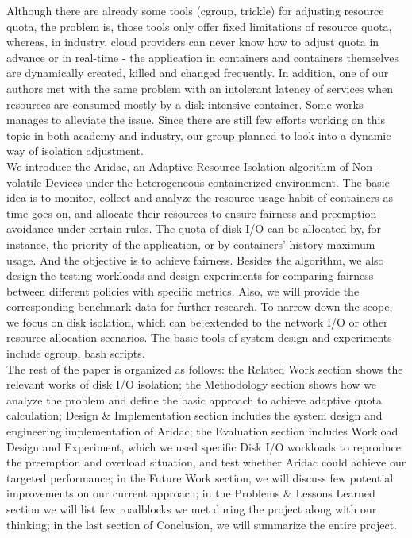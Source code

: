 \documentclass[10pt, conference,compsoc]{IEEEtran}
\begin{document}
Although there are already some tools (cgroup, trickle) for adjusting resource quota, the problem is, those tools only offer fixed limitations of resource quota, whereas, in industry, cloud providers can never know how to adjust quota in advance or in real-time - the application in containers and containers themselves are dynamically created, killed and changed frequently. In addition, one of our authors met with the same problem with an intolerant latency of services when resources are consumed mostly by a disk-intensive container. Some works \cite{Sungyong16} manages to alleviate the issue. Since there are still few efforts working on this topic in both academy and industry, our group planned to look into a dynamic way of isolation adjustment.\\

We introduce the Aridac, an Adaptive Resource Isolation algorithm of Non-volatile Devices under the heterogeneous containerized environment. The basic idea is to monitor, collect and analyze the resource usage habit of containers as time goes on, and allocate their resources to ensure fairness and preemption avoidance under certain rules. The quota of disk I/O can be allocated by, for instance, the priority of the application, or by containers' history maximum usage. And the objective is to achieve fairness. Besides the algorithm, we also design the testing workloads and design experiments for comparing fairness between different policies with specific metrics. Also, we will provide the corresponding benchmark data for further research. To narrow down the scope, we focus on disk isolation, which can be extended to the network I/O or other resource allocation scenarios. The basic tools of system design and experiments include cgroup, bash scripts.\\

The rest of the paper is organized as follows: the Related Work section shows the relevant works of disk I/O isolation; the Methodology section shows how we analyze the problem and define the basic approach to achieve adaptive quota calculation; Design \& Implementation section includes the system design and engineering implementation of Aridac; the Evaluation section includes Workload Design and Experiment, which we used specific Disk I/O workloads to reproduce the preemption and overload situation, and test whether Aridac could achieve our targeted performance; in the Future Work section, we will discuss few potential improvements on our current approach; in the Problems \& Lessons Learned section we will list few roadblocks we met during the project along with our thinking; in the last section of Conclusion, we will summarize the entire project. \\
\end{document}
